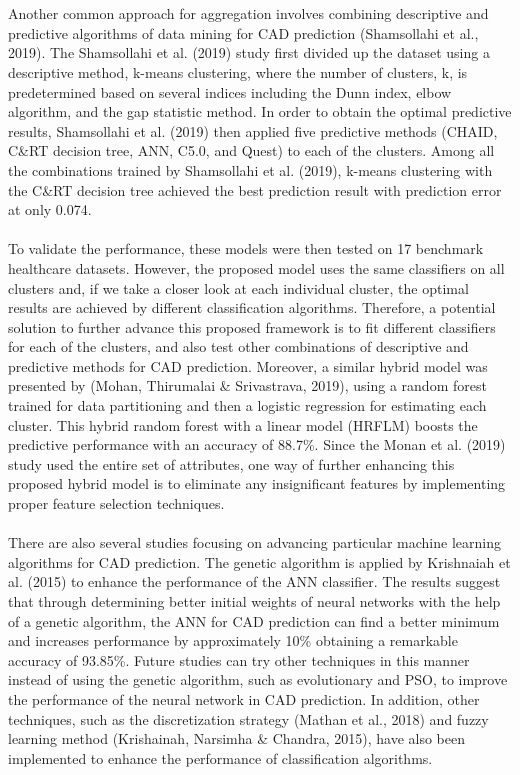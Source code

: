 \documentclass[a4paper, 12pt]{article}
\begin{document}
    \\\\
    Another common approach for aggregation involves combining descriptive and predictive algorithms of data mining for CAD prediction (Shamsollahi et al., 2019).  The Shamsollahi et al. (2019) study first divided up the dataset using a descriptive method, k-means clustering, where the number of clusters, k, is predetermined based on several indices including the Dunn index, elbow algorithm, and the gap statistic method. In order to obtain the optimal predictive results, Shamsollahi et al. (2019) then applied five predictive methods (CHAID, C\&RT decision tree, ANN, C5.0, and Quest) to each of the clusters. Among all the combinations trained by Shamsollahi et al. (2019), k-means clustering with the C\&RT decision tree achieved the best prediction result with prediction error at only 0.074. 
    \\\\
    To validate the performance, these models were then tested on 17 benchmark healthcare datasets. However, the proposed model uses the same classifiers on all clusters and, if we take a closer look at each individual cluster, the optimal results are achieved by different classification algorithms. Therefore, a potential solution to further advance this proposed framework is to fit different classifiers for each of the clusters, and also test other combinations of descriptive and predictive methods for CAD prediction. Moreover, a similar hybrid model was presented by (Mohan, Thirumalai \& Srivastrava, 2019), using a random forest trained for data partitioning and then a logistic regression for estimating each cluster. This hybrid random forest with a linear model (HRFLM) boosts the predictive performance with an accuracy of 88.7\%. Since the Monan et al. (2019) study used the entire set of attributes, one way of further enhancing this proposed hybrid model is to eliminate any insignificant features by implementing proper feature selection techniques.\\
    \\
    There are also several studies focusing on advancing particular machine learning algorithms for CAD prediction. The genetic algorithm is applied by Krishnaiah et al. (2015) to enhance the performance of the ANN classifier. The results suggest that through determining better initial weights of neural networks with the help of a genetic algorithm, the ANN for CAD prediction can find a better minimum and increases performance by approximately 10\% obtaining a remarkable accuracy of 93.85\%. Future studies can try other techniques in this manner instead of using the genetic algorithm, such as evolutionary and PSO, to improve the performance of the neural network in CAD prediction. In addition, other techniques, such as the discretization strategy (Mathan et al., 2018) and fuzzy learning method (Krishainah, Narsimha \& Chandra, 2015), have also been implemented to enhance the performance of classification algorithms.
    
\end{document}
